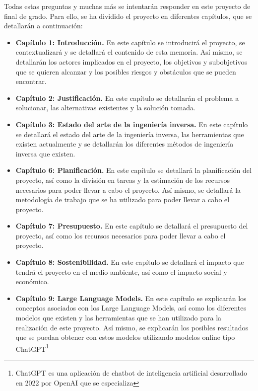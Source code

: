 Todas estas preguntas y muchas más se intentarán responder en este proyecto de final
de grado. Para ello, se ha dividido el proyecto en diferentes capítulos, que se
detallarán a continuación:

\begin{itemize}
    \item \textbf{Capítulo 1: Introducción.} En este capítulo se introducirá el proyecto,
        se contextualizará y se detallará el contenido de esta memoria. Así mismo, se
        detallarán los actores implicados en el proyecto, los objetivos y subobjetivos
        que se quieren alcanzar y los posibles riesgos y obstáculos que se pueden encontrar.
    \item \textbf{Capítulo 2: Justificación.} En este capítulo se detallarán el problema
        a solucionar, las alternativas existentes y la solución tomada.
    \item \textbf{Capítulo 3: Estado del arte de la ingeniería inversa.} En este capítulo
        se detallará el estado del arte de la ingeniería inversa, las herramientas que
        existen actualmente y se detallarán los diferentes métodos de ingeniería inversa 
        que existen.
    \item \textbf{Capítulo 6: Planificación.} En este capítulo se detallará la planificación
        del proyecto, así como la división en tareas y la estimación de los recursos
        necesarios para poder llevar a cabo el proyecto. Así mismo, se detallará la
        metodología de trabajo que se ha utilizado para poder llevar a cabo el proyecto.
    \item \textbf{Capítulo 7: Presupuesto.} En este capítulo se detallará el presupuesto
        del proyecto, así como los recursos necesarios para poder llevar a cabo el proyecto.
    \item \textbf{Capítulo 8: Sostenibilidad.} En este capítulo se detallará el impacto
        que tendrá el proyecto en el medio ambiente, así como el impacto social y económico.
    \item \textbf{Capítulo 9: Large Language Models.} En este capítulo se explicarán los
        conceptos asociados con los Large Language Models, así como los diferentes modelos
        que existen y las herramientas que se han utilizado para la realización de este
        proyecto. Así mismo, se explicarán los posibles resultados que se puedan obtener con
        estos modelos utilizando modelos online tipo ChatGPT\footnote{ChatGPT es una aplicación
        de chatbot de inteligencia artificial desarrollado en 2022 por OpenAI que se especializa
}
\end{itemize}
